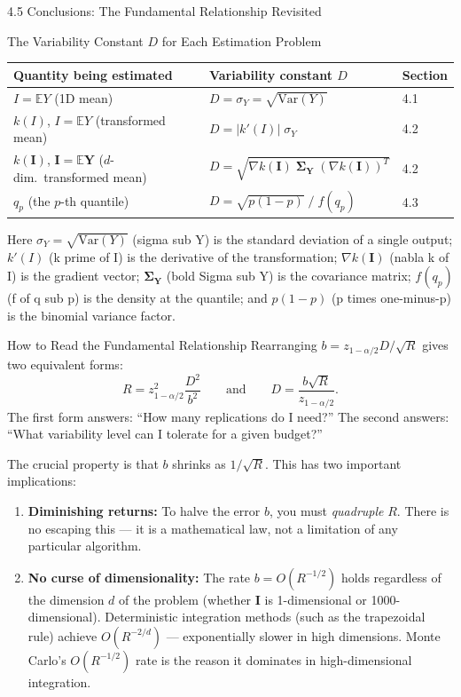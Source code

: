 \documentclass[aspectratio=169,10pt]{beamer}
\begin{document}
\begin{frame}[allowframebreaks]{4.5 Conclusions: The Fundamental Relationship Revisited}
\begin{block}{The Variability Constant $D$ for Each Estimation Problem}
  \begin{center}
    \begin{tabular}{lll}
      \toprule
      Quantity being estimated & Variability constant $D$ & Section \\
      \midrule
      $I = \mathbb{E}Y$ (1D mean) &
        $D = \sigma_Y = \sqrt{\mathrm{Var}(Y)}$ & 4.1 \\[4pt]
      $k(I)$, $I = \mathbb{E}Y$ (transformed mean) &
        $D = |k'(I)|\;\sigma_Y$ & 4.2 \\[4pt]
      $k(\mathbf{I})$, $\mathbf{I} = \mathbb{E}\mathbf{Y}$ ($d$-dim.\ transformed mean) &
        $D = \sqrt{\nabla k(\mathbf{I})\;\boldsymbol{\Sigma}_{\mathbf{Y}}\;(\nabla k(\mathbf{I}))^T}$ & 4.2 \\[4pt]
      $q_p$ (the $p$-th quantile) &
        $D = \sqrt{p(1-p)}\;/\;f(q_p)$ & 4.3 \\
      \bottomrule
    \end{tabular}
  \end{center}
  Here $\sigma_Y = \sqrt{\mathrm{Var}(Y)}$ (sigma sub Y) is the standard deviation
  of a single output; $k'(I)$ (k prime of I) is the derivative of the
  transformation; $\nabla k(\mathbf{I})$ (nabla k of I) is the gradient vector;
  $\boldsymbol{\Sigma}_{\mathbf{Y}}$ (bold Sigma sub Y) is the covariance matrix;
  $f(q_p)$ (f of q sub p) is the density at the quantile; and $p(1-p)$
  (p times one-minus-p) is the binomial variance factor.
\end{block}

\framebreak

\begin{alertblock}{How to Read the Fundamental Relationship}
  Rearranging $b = z_{1-\alpha/2} D/\sqrt{R}$ gives two equivalent forms:
  \[
    R = z_{1-\alpha/2}^2 \frac{D^2}{b^2}
    \qquad \text{and} \qquad
    D = \frac{b\sqrt{R}}{z_{1-\alpha/2}}.
  \]
  The first form answers: ``How many replications do I need?''  The second
  answers: ``What variability level can I tolerate for a given budget?''

  The crucial property is that $b$ shrinks as $1/\sqrt{R}$.  This has two
  important implications:
  \begin{enumerate}
    \item \textbf{Diminishing returns:} To halve the error $b$, you must
      \emph{quadruple} $R$.  There is no escaping this --- it is a mathematical
      law, not a limitation of any particular algorithm.
    \item \textbf{No curse of dimensionality:} The rate $b = O(R^{-1/2})$ holds
      regardless of the dimension $d$ of the problem (whether $\mathbf{I}$ is
      1-dimensional or 1000-dimensional).  Deterministic integration methods
      (such as the trapezoidal rule) achieve $O(R^{-2/d})$ --- exponentially
      slower in high dimensions.  Monte Carlo's $O(R^{-1/2})$ rate is the
      reason it dominates in high-dimensional integration.
  \end{enumerate}
\end{alertblock}


\end{frame}
\end{document}
